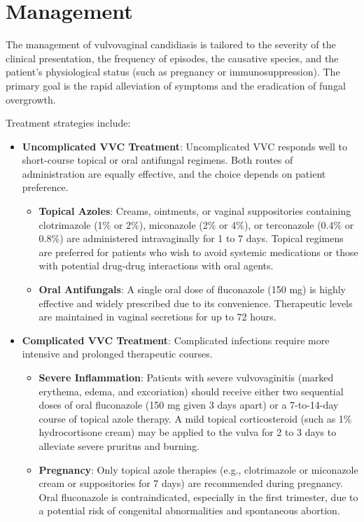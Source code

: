 \section*{Management}
The management of vulvovaginal candidiasis is tailored to the severity of the clinical presentation, the frequency of episodes, the causative species, and the patient's physiological status (such as pregnancy or immunosuppression). The primary goal is the rapid alleviation of symptoms and the eradication of fungal overgrowth.

Treatment strategies include:
\begin{itemize}
    \item \textbf{Uncomplicated VVC Treatment}: Uncomplicated VVC responds well to short-course topical or oral antifungal regimens. Both routes of administration are equally effective, and the choice depends on patient preference.
    \begin{itemize}
        \item \textbf{Topical Azoles}: Creams, ointments, or vaginal suppositories containing clotrimazole (1\% or 2\%), miconazole (2\% or 4\%), or terconazole (0.4\% or 0.8\%) are administered intravaginally for 1 to 7 days. Topical regimens are preferred for patients who wish to avoid systemic medications or those with potential drug-drug interactions with oral agents.
        \item \textbf{Oral Antifungals}: A single oral dose of fluconazole (150 mg) is highly effective and widely prescribed due to its convenience. Therapeutic levels are maintained in vaginal secretions for up to 72 hours.
    \end{itemize}
    \item \textbf{Complicated VVC Treatment}: Complicated infections require more intensive and prolonged therapeutic courses.
    \begin{itemize}
        \item \textbf{Severe Inflammation}: Patients with severe vulvovaginitis (marked erythema, edema, and excoriation) should receive either two sequential doses of oral fluconazole (150 mg given 3 days apart) or a 7-to-14-day course of topical azole therapy. A mild topical corticosteroid (such as 1\% hydrocortisone cream) may be applied to the vulva for 2 to 3 days to alleviate severe pruritus and burning.
        \item \textbf{Pregnancy}: Only topical azole therapies (e.g., clotrimazole or miconazole cream or suppositories for 7 days) are recommended during pregnancy. Oral fluconazole is contraindicated, especially in the first trimester, due to a potential risk of congenital abnormalities and spontaneous abortion.

\end{itemize}
\end{itemize}
